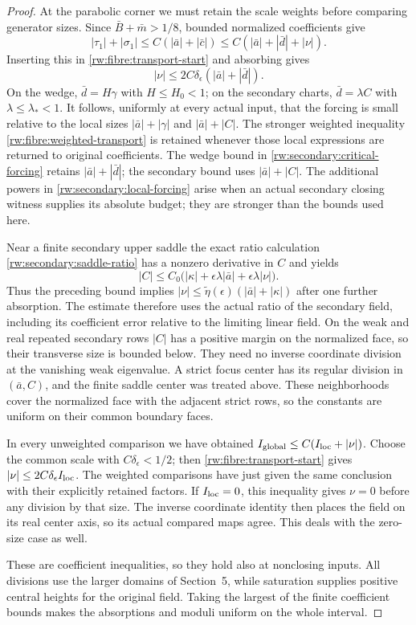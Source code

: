 \begin{proof}
At the parabolic corner we must retain the scale weights before
comparing generator sizes. Since
$\bar B+\bar m>1/8$, bounded normalized coefficients give
\[
 |\tau_1|+|\sigma_1|
       \le C(|\bar a|+|\bar c|)
       \le C(|\bar a|+|\bar d|+|\nu|).
\]
Inserting this in \eqref{rw:fibre:transport-start} and
absorbing gives
\begin{equation}\label{rw:fibre:weighted-transport}
 |\nu|\le2C\delta_\epsilon(|\bar a|+|\bar d|).
\end{equation}
On the wedge, $\bar d=H\gamma$ with $H\le H_0<1$;
on the secondary charts, $\bar d=\lambda C$ with
$\lambda\le\lambda_*<1$. It follows, uniformly at every
actual input, that the forcing is small relative to the local
sizes $|\bar a|+|\gamma|$ and $|\bar a|+|C|$.
The stronger weighted inequality
\eqref{rw:fibre:weighted-transport} is retained whenever
those local expressions are returned to original coefficients.
The wedge bound in \eqref{rw:secondary:critical-forcing} retains
$|\bar a|+|\bar d|$; the secondary bound uses $|\bar a|+|C|$.
The additional powers in \eqref{rw:secondary:local-forcing} arise
when an actual secondary closing witness supplies its absolute
budget; they are stronger than the bounds used here.

Near a finite secondary upper saddle the exact ratio calculation
\eqref{rw:secondary:saddle-ratio} has a nonzero derivative
in $C$ and yields
\[
 |C|\le C_0\bigl(|\kappa|+
                  \epsilon\lambda|\bar a|
                  +\epsilon\lambda|\nu|\bigr).
\]
Thus the preceding bound implies
$|\nu|\le\widetilde\eta(\epsilon)
 (|\bar a|+|\kappa|)$ after one further absorption.
The estimate therefore uses the actual ratio of the secondary field,
including its coefficient error relative to the limiting linear field.
On the weak and real repeated secondary rows $|C|$ has a
positive margin on the normalized face, so their transverse
size is bounded below. They need no inverse coordinate
division at the vanishing weak eigenvalue. A strict focus
center has its regular division in $(\bar a,C)$, and the
finite saddle center was treated above. These neighborhoods
cover the normalized face with the adjacent strict rows,
so the constants are uniform on their common boundary faces.

In every unweighted comparison we have obtained
$I_{\rm global}\le C(I_{\rm loc}+|\nu|)$.
Choose the common scale with $C\delta_\epsilon<1/2$;
then \eqref{rw:fibre:transport-start} gives
$|\nu|\le2C\delta_\epsilon I_{\rm loc}$.
The weighted comparisons have just given the same conclusion
with their explicitly retained factors. If $I_{\rm loc}=0$,
this inequality gives $\nu=0$ before any division by that
size. The inverse coordinate identity then places the field
on its real center axis, so its actual compared maps agree.
This deals with the zero-size case as well.

These are coefficient inequalities, so they hold also at nonclosing
inputs. All divisions use the larger domains of Section~5, while
saturation supplies positive central heights for the original field.
Taking the largest of the finite coefficient bounds makes the
absorptions and moduli uniform on the whole interval.
\end{proof}
